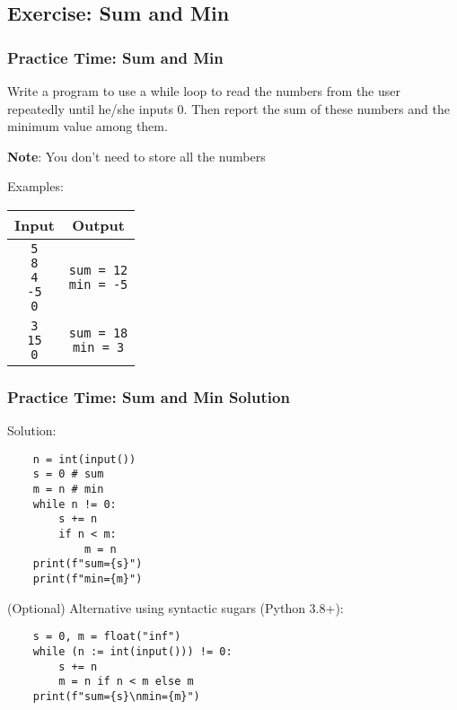 \documentclass{beamer}
\begin{document}
\subsection{Exercise: Sum and Min}
\begin{frame}[fragile]
    \frametitle{Practice Time: Sum and Min}

    Write a program to use a while loop to read the numbers
    from the user repeatedly until he/she inputs 0.
    Then report the sum of these numbers and the minimum value among them.

    \textbf{Note}: You don't need to store all the numbers

    Examples:

    \begin{tabular}{|c|c|}
        \hline
        Input & Output                          \\ \hline
        \makecell[tl]{\texttt{5}                \\ \texttt{8} \\ \texttt{4} \\ \texttt{-5} \\ \texttt{0}}
              & \makecell[tl]{\texttt{sum = 12} \\ \texttt{min = -5}} \\ \hline
        \makecell[tl]{\texttt{3}                \\ \texttt{15} \\ \texttt{0}}
              & \makecell[tl]{\texttt{sum = 18} \\ \texttt{min = 3}} \\ \hline
    \end{tabular}
\end{frame}
\begin{frame}[fragile]
    \frametitle{Practice Time: Sum and Min Solution}

    Solution:
    \begin{verbatim}
    n = int(input())
    s = 0 # sum
    m = n # min
    while n != 0:
        s += n
        if n < m:
            m = n
    print(f"sum={s}")
    print(f"min={m}")
    \end{verbatim}

    (Optional) Alternative using syntactic sugars (Python 3.8+):
    \begin{verbatim}
    s = 0, m = float("inf")
    while (n := int(input())) != 0:
        s += n
        m = n if n < m else m
    print(f"sum={s}\nmin={m}")
    \end{verbatim}
\end{frame}
\end{document}
